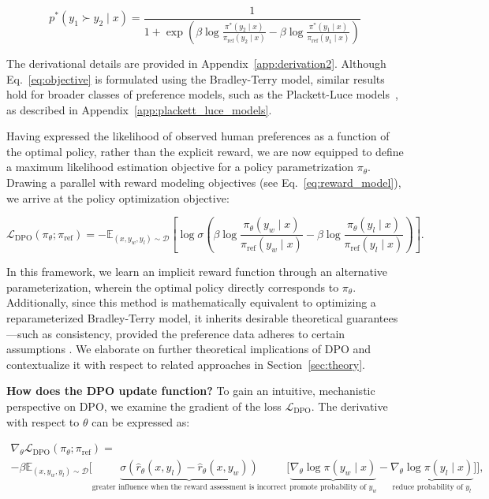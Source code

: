 \begin{equation}\label{eq:objective}
    p^*(y_1\succ y_2 \mid x)=\frac{1}{1 + \exp\left(\beta \log \frac{\pi^*(y_2\mid x)}{\pi_\text{ref}(y_2\mid x)} - \beta \log \frac{\pi^*(y_1\mid x)}{\pi_\text{ref}(y_1\mid x)}\right)}
\end{equation}

The derivational details are provided in Appendix~\ref{app:derivation2}. Although Eq.~\ref{eq:objective} is formulated using the Bradley-Terry model, similar results hold for broader classes of preference models, such as the Plackett-Luce models~\citep{plackett1975analysis, luce2012individual}, as described in Appendix~\ref{app:plackett_luce_models}.

Having expressed the likelihood of observed human preferences as a function of the optimal policy, rather than the explicit reward, we are now equipped to define a maximum likelihood estimation objective for a policy parametrization $\pi_\theta$. Drawing a parallel with reward modeling objectives (see Eq.~\ref{eq:reward_model}), we arrive at the policy optimization objective:

\begin{equation}\label{eq:optimum_model}
    \mathcal{L}_\text{DPO}(\pi_{\theta}; \pi_\text{ref}) = -\mathbb{E}_{(x, y_w, y_l)\sim \mathcal{D}}\left[\log \sigma \left(\beta \log \frac{\pi_{\theta}(y_w\mid x)}{\pi_\text{ref}(y_w\mid x)} - \beta \log \frac{\pi_{\theta}(y_l\mid x)}{\pi_\text{ref}(y_l\mid x)}\right)\right].
\end{equation}

In this framework, we learn an implicit reward function through an alternative parameterization, wherein the optimal policy directly corresponds to $\pi_\theta$. Additionally, since this method is mathematically equivalent to optimizing a reparameterized Bradley-Terry model, it inherits desirable theoretical guarantees—such as consistency, provided the preference data adheres to certain assumptions \cite{bong2022generalized}. We elaborate on further theoretical implications of DPO and contextualize it with respect to related approaches in Section~\ref{sec:theory}.

\textbf{How does the DPO update function?} To gain an intuitive, mechanistic perspective on DPO, we examine the gradient of the loss $\mathcal{L}_\text{DPO}$. The derivative with respect to $\theta$ can be expressed as:

\begin{multline*}\label{eq:gradient}
    \nabla_\theta \mathcal{L}_\text{DPO}(\pi_\theta;\pi_\text{ref}) = \\ -\beta\mathbb{E}_{(x, y_w, y_l) \sim \mathcal{D}} \bigg[\underbrace{\sigma(\hat{r}_\theta(x, y_l) - \hat{r}_\theta (x, y_w))}_\text{greater influence when the reward assessment is incorrect}\bigg[\underbrace{\nabla_\theta\log \pi(y_w \mid x)}_\text{promote probability of $y_w$} - \underbrace{\nabla_\theta\log\pi(y_l \mid x)}_\text{reduce probability of $y_l$}\bigg]\bigg],
\end{multline*}

